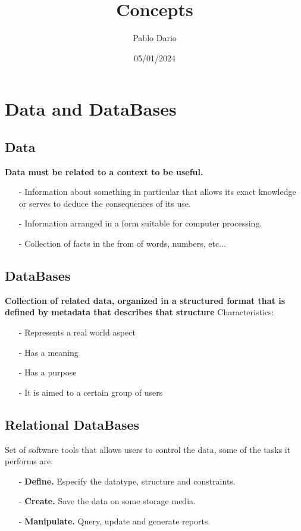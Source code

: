 \documentclass{article}
\title{Concepts}
\author{Pablo Dario}
\date{05/01/2024}
\begin{document}
\maketitle
\section{Data and DataBases}

\subsection{Data}

\textbf{Data must be related to a context to be useful.} 
\begin{itemize}
    \item[-] Information about something in particular that allows its exact knowledge or serves to deduce the consequences of its use.
    \item[-] Information arranged in a form suitable for computer processing.
    \item[-] Collection of facts in the from of words, numbers, etc...
\end{itemize}
 
\subsection{DataBases}

\textbf{Collection of related data, organized in a structured format that is defined by metadata that describes that structure} Characteristics:

\begin{itemize}
    \item[-] Represents a real world aspect
    \item[-] Has a meaning
    \item[-] Has a purpose
    \item[-] It is aimed to a certain group of users
\end{itemize}

\subsection{Relational DataBases}

Set of software tools that allows users to control the data, some of the tasks it performs are:
\begin{itemize}
    \item[-] \textbf{Define.} Especify the datatype, structure and constraints.
    \item[-] \textbf{Create.} Save the data on some storage media.
    \item[-] \textbf{Manipulate.} Query, update and generate reports.
\end{itemize}
\end{document}
